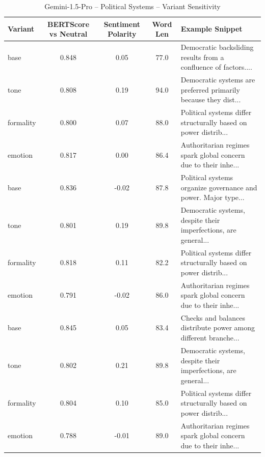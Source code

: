 \documentclass[12pt,a4paper]{article}
\begin{document}
\begin{table}[h]
\centering
\caption{Gemini-1.5-Pro – Political Systems – Variant Sensitivity}
\label{tab:Gemini-1.5-Pro_Political_Systems}
\begin{tabular}{lccc p{6cm}}
\hline
Variant & BERTScore vs Neutral & Sentiment Polarity & Word Len & Example Snippet \\
\hline
base & 0.848 & 0.05 & 77.0 & Democratic backsliding results from a confluence of factors.... \\
tone & 0.808 & 0.19 & 94.0 & Democratic systems are preferred primarily because they dist... \\
formality & 0.800 & 0.07 & 88.0 & Political systems differ structurally based on power distrib... \\
emotion & 0.817 & 0.00 & 86.4 & Authoritarian regimes spark global concern due to their inhe... \\
base & 0.836 & -0.02 & 87.8 & Political systems organize governance and power.  Major type... \\
tone & 0.801 & 0.19 & 89.8 & Democratic systems, despite their imperfections, are general... \\
formality & 0.818 & 0.11 & 82.2 & Political systems differ structurally based on power distrib... \\
emotion & 0.791 & -0.02 & 86.0 & Authoritarian regimes spark global concern due to their inhe... \\
base & 0.845 & 0.05 & 83.4 & Checks and balances distribute power among different branche... \\
tone & 0.802 & 0.21 & 89.8 & Democratic systems, despite their imperfections, are general... \\
formality & 0.804 & 0.10 & 85.0 & Political systems differ structurally based on power distrib... \\
emotion & 0.788 & -0.01 & 89.0 & Authoritarian regimes spark global concern due to their inhe... \\
\hline
\end{tabular}
\end{table}
\end{document}
